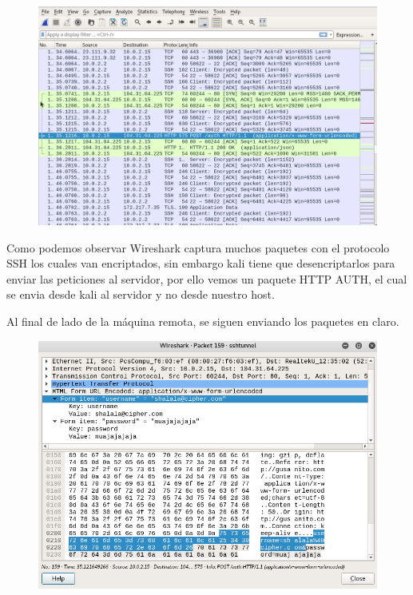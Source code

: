 \documentclass{article}
\begin{document}
\begin{figure}[H]
\centering
\includegraphics[width=1\textwidth]{16-WIRESHARKHTTPAUTH}
\end{figure}
Como podemos observar Wireshark captura muchos paquetes con el protocolo SSH los cuales van encriptados, sin embargo kali tiene que desencriptarlos para enviar las peticiones al servidor, por ello vemos un paquete HTTP AUTH, el cual se envia desde kali al servidor y no desde nuestro host.

Al final de lado de la m\'aquina remota, se siguen enviando los paquetes en claro.

\begin{figure}[H]
\centering
\includegraphics[width=1\textwidth]{17-CONTRASENAENCLARO}
\end{figure}
\end{document}
